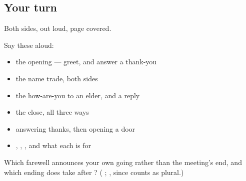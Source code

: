 \subsection*{Your turn}
Both sides, out loud, page covered.

Say these aloud:

\begin{itemize}
\raggedright
  \item the opening — greet, and answer a thank-you
  \item the name trade, both sides
  \item the how-are-you to an elder, and a reply
  \item the close, all three ways
  \item \textbf{  } answering thanks, then opening a door
  \item \textbf{}, \textbf{}, \textbf{}, and what each is for
\end{itemize}

\begin{tcolorbox}[breakable,colback=teal!4,colframe=teal!35!black,title={Before you move on}]
Which farewell announces your own going rather than the meeting's end, and which ending does \textbf{} take after \textbf{}? (\textbf{ }; \textbf{}, since \textbf{} counts as plural.)
\end{tcolorbox}
